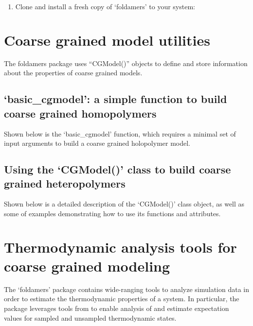 \documentclass[letterpaper,12pt,english,openany,oneside]{sphinxmanual}
\begin{document}
\begin{enumerate}
\item {} 
Clone and install a fresh copy of ‘foldamers’ to your system:

\begin{sphinxVerbatim}[commandchars=\\\{\}]
  
 
  
\end{sphinxVerbatim}

\end{enumerate}


\chapter{Coarse grained model utilities}
\label{\detokenize{cg_model:coarse-grained-model-utilities}}\label{\detokenize{cg_model::doc}}
The foldamers package uses “CGModel()” objects to define and store information about the properties of coarse grained models.


\section{‘basic\_cgmodel’: a simple function to build coarse grained homopolymers}
\label{\detokenize{cg_model:basic-cgmodel-a-simple-function-to-build-coarse-grained-homopolymers}}
Shown below is the ‘basic\_cgmodel’ function, which requires a minimal set of input arguments to build a coarse grained holopolymer model.

\newpage


\section{Using the ‘CGModel()’ class to build coarse grained heteropolymers}
\label{\detokenize{cg_model:using-the-cgmodel-class-to-build-coarse-grained-heteropolymers}}
Shown below is a detailed description of the ‘CGModel()’ class object, as well as some of examples demonstrating how to use its functions and attributes.


\chapter{Thermodynamic analysis tools for coarse grained modeling}
\label{\detokenize{thermo:thermodynamic-analysis-tools-for-coarse-grained-modeling}}\label{\detokenize{thermo::doc}}
The ‘foldamers’ package contains wide-ranging tools to analyze simulation data in order to estimate the thermodynamic properties of a system.  In particular, the package leverages tools from  to enable analysis of and estimate expectation values for sampled and unsampled thermodynamic states.
\end{document}
